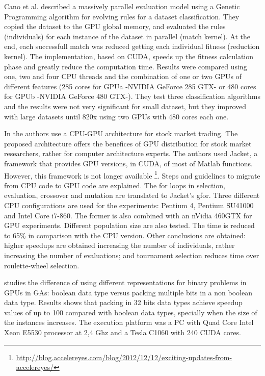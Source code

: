 \documentclass[prodmode,acmtecs]{acmsmall}
\begin{document}
Cano et al. \cite{SpeedingTheEvaluationofGPCano:2012} described a massively parallel evaluation model using a Genetic Programming algorithm for evolving rules for a dataset classification. They copied the dataset to the GPU global memory, and evaluated the rules (individuals) for each instance of the dataset in parallel (match kernel). At the end, each successfull match was reduced getting each individual fitness (reduction kernel). The implementation, based on CUDA, speeds up the fitness calculation phase and greatly reduce the computation time. Results were compared using one, two and four CPU threads and the combination of one or two GPUs of different features (285 cores for GPUa -NVIDIA GeForce 285 GTX- or 480 cores for GPUb -NVIDIA GeForce 480 GTX-). They test three classification algorithms and the results were not very significant for small dataset, but they improved with large datasets until 820x using two GPUs with 480 cores each one. %

In \cite{Contreras:2012:UGA:2150467.2150469} the authors use a CPU-GPU architecture for stock market trading. The proposed architecture offers the benefices of GPU distribution for stock market researchers, rather for computer architecture experts. The authors used Jacket, a framework that provides GPU versions, in CUDA, of most of Matlab functions. However, this framework is not longer available \footnote{\url{http://blog.accelereyes.com/blog/2012/12/12/exciting-updates-from-accelereyes/}}. Steps and guidelines to migrate from CPU code to GPU code are explained. The for loops in selection, evaluation, crossover and mutation are translated to Jacket's gfor. Three different CPU configurations are used for the experiments: Pentium 4, Pentium SU41000 and Intel Core i7-860. The former is also combined with an nVidia 460GTX for GPU experiments. Different population size are also tested. The time is reduced to 65\% in comparison with the CPU version. Other conclusions are obtained: higher speedups are obtained increasing the number of individuals, rather increasing the number of evaluations; and tournament selection reduces time over roulette-wheel selection. %




\cite{Pedemonte:2011:BOG:2001858.2002031} studies the difference of using different representations for binary problems in GPUs in GAs: boolean data type versus packing multiple bits in a non boolean data type. Results shows that
packing in 32 bits data types achieve speedup values of up to 100 compared with boolean data types, specially when the size of the instances increases. The execution platform was a PC with Quad Core Intel Xeon E5530 processor at 2,4 Ghz and a Tesla C1060 with 240 CUDA cores.
\end{document}
